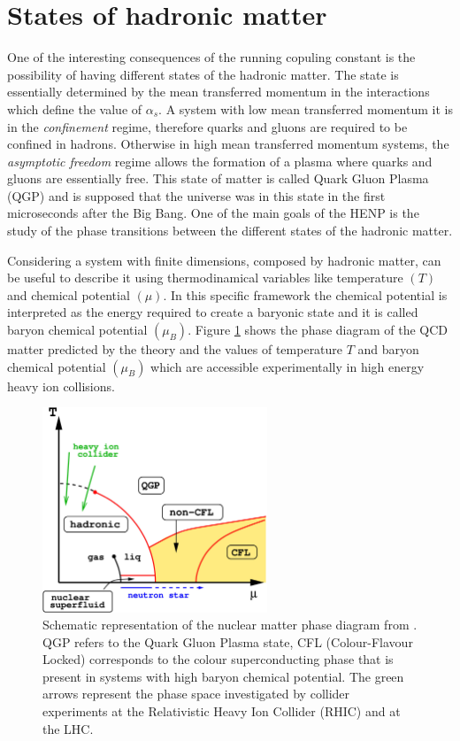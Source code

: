 %
%
\section{States of hadronic matter}
\label{sec:1.2}

One of the interesting consequences of the running copuling constant is the possibility of having
different states of the hadronic matter. The state is essentially determined by the mean transferred 
momentum in the interactions which define the value of $\alpha_{s}$. 
A system with low mean transferred momentum it is in the \textit{confinement} regime, therefore quarks
and gluons are required to be confined in hadrons. Otherwise in high mean transferred momentum systems,
the \textit{asymptotic freedom} regime allows the formation of a plasma where quarks and gluons are
essentially free. This state of matter is called Quark Gluon Plasma (QGP) and is supposed that the 
universe was in this state in the first microseconds after the Big Bang.
One of the main goals of the HENP is the study of the phase transitions between the different
states of the hadronic matter.

Considering a system with finite dimensions, composed by hadronic matter, can be useful to describe it 
using thermodinamical variables like temperature $(T)$ and chemical potential $(\mu)$. In this
specific framework the chemical potential is interpreted as the energy required to create a 
baryonic state and it is called baryon chemical potential $(\mu_{B})$. 
Figure \ref{fig:qgpdiagram} shows the phase diagram of the QCD matter predicted by the theory and 
the values of temperature $T$ and baryon chemical potential $(\mu_{B})$ which are accessible
experimentally in high energy heavy ion collisions.

\begin{figure}[]
    \centering
    \includegraphics[width=0.6\textwidth]{gfx/qgpphase}
	\caption{Schematic representation of the nuclear matter phase diagram from \cite{qgpphase}. QGP refers to the Quark Gluon Plasma state, CFL (Colour-Flavour Locked) corresponds to the colour superconducting phase that is present in systems with high baryon chemical potential. The green arrows represent the phase space investigated by collider experiments at the Relativistic Heavy Ion Collider (RHIC) and at the LHC.}
	\label{fig:qgpdiagram}
\end{figure}

